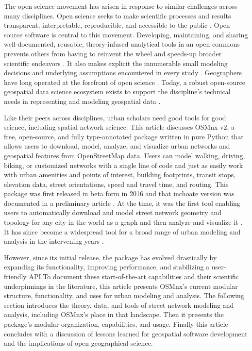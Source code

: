 \documentclass[12pt,letterpaper]{article} %
\begin{document}
The open science movement has arisen in response to similar challenges across many disciplines. Open science seeks to make scientific processes and results transparent, interpretable, reproducible, and accessible to the public \citep{kedron_reproducibility_2021}. Open-source software is central to this movement. Developing, maintaining, and sharing well-documented, reusable, theory-infused analytical tools in an open commons prevents others from having to reinvent the wheel and speeds-up broader scientific endeavors \citep{singleton_establishing_2016}. It also makes explicit the innumerable small modeling decisions and underlying assumptions encountered in every study \citep{gahegan_our_2018,rey_pysal_2022}. Geographers have long operated at the forefront of open science \citep{rey_show_2009,harris_more_2017}. Today, a robust open-source geospatial data science ecosystem exists to support the discipline's technical needs in representing and modeling geospatial data \citep{fleischmann_momepy_2019,rey_pysal:_2019,van_den_bossche_geopandasgeopandas_2024}.

Like their peers across disciplines, urban scholars need good tools for good science, including spatial network science. This article discusses OSMnx v2, a free, open-source, and fully type-annotated package written in pure Python that allows users to download, model, analyze, and visualize urban networks and geospatial features from OpenStreetMap data. Users can model walking, driving, biking, or customized networks with a single line of code and just as easily work with urban amenities and points of interest, building footprints, transit stops, elevation data, street orientations, speed and travel time, and routing. This package was first released in beta form in 2016 and that inchoate version was documented in a preliminary article \citep{boeing_osmnx:_2017}. At the time, it was the first tool enabling users to automatically download and model street network geometry and topology for any city in the world as a graph and then analyze and visualize it \citep{boeing_right_2020}. It has since become a widespread tool for a broad range of urban modeling and analysis in the intervening years \citep[e.g.,][]{coutrot_entropy_2022,dacci_signature_2019,feng_spatial_2020,gervasoni_calculating_2017,liao_disparities_2020,natera_orozco_data-driven_2020,yin_multi-task_2020,young_automatic_2020}.

However, since its initial release, the package has evolved drastically by expanding its functionality, improving performance, and stabilizing a user-friendly API.\@ To document these start-of-the-art capabilities and their scientific underpinnings in the literature, this article presents OSMnx's current modular structure, functionality, and uses for urban modeling and analysis. The following section introduces the theory, data, and tools of street network modeling and analysis, including OSMnx's place in that landscape. Then it presents the package's modular organization, capabilities, and usage. Finally this article concludes with a discussion of lessons learned for geospatial software development and the implications of open geographical science.
\end{document}
